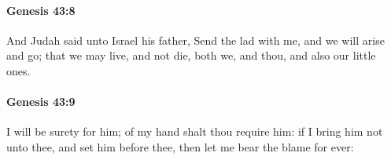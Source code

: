 		\paragraph{Genesis 43:8} %
			\label{GENESIS-43-8}

			And Judah said unto Israel his father, Send the lad with me, and we will arise and go; that we may live, and not die, both we, and thou, and also our little ones.


		\paragraph{Genesis 43:9} %
			\label{GENESIS-43-9}

			I will be surety for him; of my hand shalt thou require him: if I bring him not unto thee, and set him before thee, then let me bear the blame for ever:


